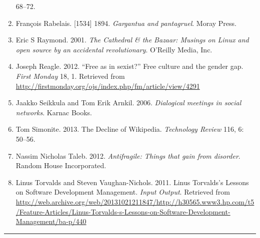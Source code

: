 \begin{enumerate}
  68--72.
\item
  François Rabelais. {[}1534{]} 1894. \emph{Gargantua and pantagruel}.
  Moray Press.
\item
  Eric S Raymond. 2001. \emph{The Cathedral \& the Bazaar: Musings on
  Linux and open source by an accidental revolutionary}. O'Reilly Media,
  Inc.
\item
  Joseph Reagle. 2012. ``Free as in sexist?'' Free culture and the
  gender gap. \emph{First Monday} 18, 1. Retrieved from
  \url{http://firstmonday.org/ojs/index.php/fm/article/view/4291}
\item
  Jaakko Seikkula and Tom Erik Arnkil. 2006. \emph{Dialogical meetings
  in social networks}. Karnac Books.
\item
  Tom Simonite. 2013. The Decline of Wikipedia. \emph{Technology Review}
  116, 6: 50--56.
\item
  Nassim Nicholas Taleb. 2012. \emph{Antifragile: Things that gain from
  disorder}. Random House Incorporated.
\item
  Linus Torvalds and Steven Vaughan-Nichols. 2011. Linus Torvalds's
  Lessons on Software Development Management. \emph{Input Output}.
  Retrieved from
  \url{http://web.archive.org/web/20131021211847/http://h30565.www3.hp.com/t5/Feature-Articles/Linus-Torvalds-s-Lessons-on-Software-Development-Management/ba-p/440}
\end{enumerate}

\begin{center}\rule{0.5\linewidth}{0.5pt}\end{center}
